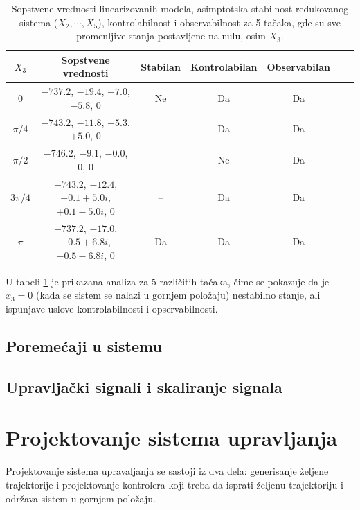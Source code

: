\documentclass[a4paper,11pt]{article}
\theoremstyle{definition} \newtheorem{deff}{Definicija}[section]
\theoremstyle{definition} \newtheorem{prim}[deff]{Primer}
\theoremstyle{plain} \newtheorem{teor}[deff]{Teorema}
\begin{document}
	
	
	\begin{table}[H]
		\centering
		\caption{Sopstvene vrednosti linearizovanih modela, asimptotska stabilnost redukovanog sistema ($X_2, \cdots, X_5$), kontrolabilnost i observabilnost za 5 tačaka, gde su sve promenljive stanja postavljene na nulu, osim $X_3$.}
		\label{table:eigenvalues}
		\begin{tabular}{c c c c c c c}
			\hline
			$X_3$ & Sopstvene vrednosti & Stabilan & Kontrolabilan & Observabilan \\
			\hline
			0 & $-737.2$, $-19.4$, $+7.0$, $-5.8$, $0$ & Ne & Da & Da \\
			$\pi/4$ & $-743.2$, $-11.8$, $-5.3$, $+5.0$, $0$ & -- & Da & Da \\
			$\pi/2$ & $-746.2$, $-9.1$, $-0.0$, $0$, $0$ & -- & Ne & Da \\
			$3\pi/4$ & $-743.2$, $-12.4$, $+0.1 + 5.0i$, $+0.1 - 5.0i$, $0$ & -- & Da & Da \\
			$\pi$ & $-737.2$, $-17.0$, $-0.5 + 6.8i$, $-0.5 - 6.8i$, $0$ & Da & Da & Da \\
			\hline
		\end{tabular}
		\label{tab:5_tacaka}
	\end{table}
	
	U tabeli \ref{tab:5_tacaka} je prikazana analiza za 5 različitih tačaka, čime se pokazuje da je $x_3 = 0$ (kada se sistem se nalazi u gornjem položaju) nestabilno stanje, ali ispunjave uslove kontrolabilnosti i opservabilnosti.
	
	\clearpage
	\subsection{Poremećaji u sistemu}
	
	
	
	
	\clearpage
	\subsection{Upravljački signali i skaliranje signala}
	
	
	
	
	\newpage
	
	
	
	\section{Projektovanje sistema upravljanja}
	
	Projektovanje sistema upravaljanja se sastoji iz dva dela: generisanje željene trajektorije i projektovanje kontrolera koji treba da isprati željenu trajektoriju i održava sistem u gornjem položaju. \\
	
\end{document}
